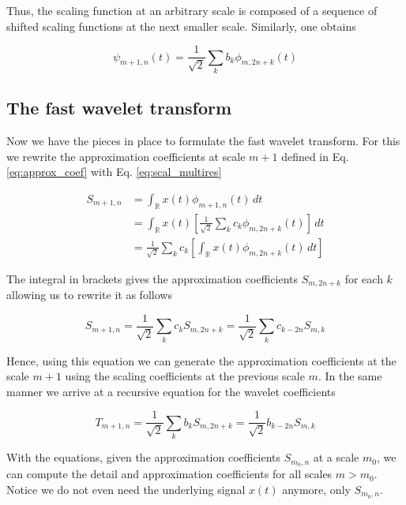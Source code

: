 Thus, the scaling function at an arbitrary scale is composed of a sequence of shifted scaling functions at the next smaller scale. Similarly, one obtains

\begin{equation}
    \psi_{m+1, n}(t) = \frac{1}{\sqrt{2}} \sum_k b_k \phi_{m, 2n+k}(t)
    \label{eq:wavelet_multires}
\end{equation}

\subsection{The fast wavelet transform}

Now we have the pieces in place to formulate the fast wavelet transform. For this we rewrite the approximation coefficients at scale $m+1$ defined in Eq. \ref{eq:approx_coef}
with Eq. \ref{eq:scal_multires}

\begin{align}
    S_{m+1, n} &= \int_{\mathbb{R}} x(t) \phi_{m+1, n}(t) \,dt \nonumber\\ 
               &= \int_{\mathbb{R}} x(t) \left[\frac{1}{\sqrt{2}} \sum_k c_k \phi_{m, 2n+k}(t)\right] \,dt \nonumber\\
               &= \frac{1}{\sqrt{2}} \sum_k c_k \left[\int_{\mathbb{R}} x(t) \phi_{m, 2n+k}(t) \,dt\right]
\end{align}

The integral in brackets gives the approximation coefficients $S_{m, 2n+k}$ for each $k$ allowing us to rewrite it as follows

\begin{equation}
    S_{m+1,n} = \frac{1}{\sqrt{2}} \sum_k c_k S_{m, 2n+k} = \frac{1}{\sqrt{2}} \sum_k c_{k-2n} S_{m, k}
    \label{eq:detail_coef_recur}
\end{equation}

Hence, using this equation we can generate the approximation coefficients at the scale $m+1$ using the scaling coefficients at the previous scale $m$.
In the same manner we arrive at a recursive equation for the wavelet coefficients

\begin{equation}
    T_{m+1, n} = \frac{1}{\sqrt{2}} \sum_k b_k S_{m, 2n+k} = \frac{1}{\sqrt{2}} b_{k-2n} S_{m,k}
    \label{eq:wavelet_coef_recur}
\end{equation}

With the equations, given the approximation coefficients $S_{m_0, n}$ at a scale $m_0$, we can compute the detail and approximation coefficients for all scales
$m>m_0$. Notice we do not even need the underlying signal $x(t)$ anymore, only $S_{m_0, n}$.

